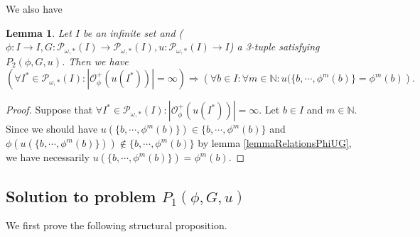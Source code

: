 \documentclass[a4paper,11pt]{article}
\theoremstyle{plain}
\newtheorem{lemma}{Lemma}[section]
\theoremstyle{definition}
\theoremstyle{remark}
\begin{document}
We also have

\begin{lemma}
Let $I$ be an infinite set and ($\phi : I \to I,G : \mathcal{P}_{\omega,*}(I) \to \mathcal{P}_{\omega,*}(I),u : \mathcal{P}_{\omega,*}(I) \to I$) a 3-tuple satisfying $P_2(\phi,G,u)$. Then we have
\[ \left( \forall I^* \in \mathcal{P}_{\omega,*}(I) : |\mathcal{O}^{+}_\phi(u(I^*))| = \infty \right) \Rightarrow \left( \forall b \in I : \forall m \in \mathbb{N} : u(\{b,\cdots,\phi^m(b)\} = \phi^m(b) \right). \]
\end{lemma}

\begin{proof}
Suppose that $\forall I^* \in \mathcal{P}_{\omega,*}(I) : |\mathcal{O}^{+}_\phi(u(I^*))| = \infty$. Let  $b \in I$ and $m \in \mathbb{N}$. Since we should have $u(\{b,\cdots,\phi^m(b)\}) \in \{b,\cdots,\phi^m(b)\}$ and $\phi(u(\{b,\cdots, \phi^m(b)\})) \notin \{b,\cdots, \phi^m(b)\}$ by lemma \ref{lemmaRelationsPhiUG}, we have necessarily $u(\{b,\cdots, \phi^m(b)\}) = \phi^m(b)$.
\end{proof}




\subsection{Solution to problem $P_1(\phi,G,u)$}

We first prove the following structural proposition.
\end{document}
